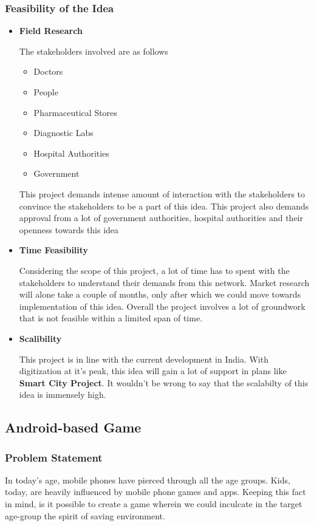 \documentclass{article}
\begin{document}
\subsubsection{Feasibility of the Idea}
\begin{itemize}
\item \textbf{Field Research}
\par The stakeholders involved are as follows
\begin{itemize}
    \item Doctors
    \item People
    \item Pharmaceutical Stores
    \item Diagnostic Labs
    \item Hospital Authorities
    \item Government
\end{itemize}
This project demands intense amount of interaction with the stakeholders to convince the stakeholders to be a part of this idea. This project also demands approval from a lot of government authorities, hospital authorities and their openness towards this idea

\item \textbf{Time Feasibility}
\par Considering the scope of this project, a lot of time has to spent with the stakeholders to understand their demands from this network. Market research will alone take a couple of months, only after which we could move towards implementation of this idea. Overall the project involves a lot of groundwork that is not feasible within a limited span of time.
\item \textbf{Scalibility}
\par This project is in line with the current development in India. With digitization at it's peak, this idea will gain a lot of support in plans like \textbf{Smart City Project}. It wouldn't be wrong to say that the scalabilty of this idea is immensely high.
\end{itemize}


\subsection{Android-based Game}
\subsubsection{Problem Statement}
\par In today's age, mobile phones have pierced through all the age groups. Kids, today, are heavily influenced by mobile phone games and apps. Keeping this fact in mind, is it possible to create a game wherein we could inculcate in the target age-group the spirit of saving environment. 
\end{document}
